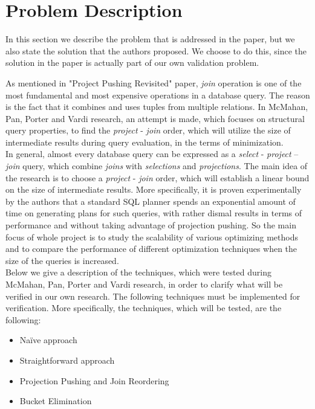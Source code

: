 \section{Problem Description}
In this section we describe the problem that is addressed in the paper, but we also state the solution that the authors proposed. We choose to do this, since the solution in the paper is actually part of our own validation problem.

As mentioned in "Project Pushing Revisited" paper, \textit{join} operation is one of the most fundamental and most expensive operations in a database query. The reason is the fact that it combines and uses tuples from multiple relations. In McMahan, Pan, Porter and Vardi research, an attempt is made, which focuses on structural query properties, to find the \textit{project} - \textit{join} order, which will utilize the size of intermediate results during query evaluation, in the terms of minimization. \\

In general, almost every database query can be expressed as a \textit{select} - \textit{project} – \textit{join} query, which combine \textit{joins} with \textit{selections} and \textit{projections}. The main idea of the research is to choose a \textit{project} - \textit{join} order, which will establish a linear bound on the size of intermediate results. More specifically, it is proven experimentally by the authors that a standard SQL planner spends an exponential amount of time on generating plans for such queries, with rather dismal results in terms of performance and without taking advantage of projection pushing. So the main focus of whole project is to study the scalability of various optimizing methods and to compare the performance of different optimization techniques when the size of the queries is increased. \\

Below we give a description of the techniques, which were tested during McMahan, Pan, Porter and Vardi research, in order to clarify what will be verified in our own research. The following techniques must be implemented for verification. More specifically, the techniques, which will be tested, are the following:

\begin{itemize}
	\item Na\"ive approach
	\item Straightforward approach
	\item Projection Pushing and Join Reordering
	\item Bucket Elimination
\end{itemize}

